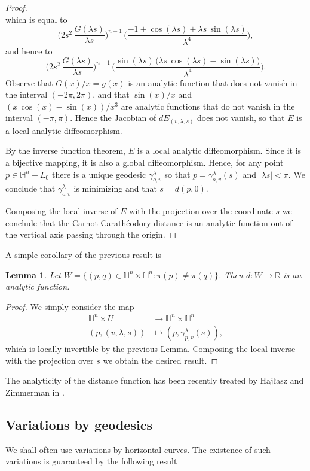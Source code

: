 \documentclass[10pt]{amsart}
\newtheorem{lemma}[theorem]{Lemma}
\theoremstyle{definition}
\theoremstyle{remark}
\numberwithin{equation}{section}
\begin{document}
\begin{proof}
\[\]
which is equal to
\[
\bigg(2s^2\,\frac{G({\lambda} s)}{{\lambda} s}\bigg)^{n-1}\,
\bigg(\frac{-1+\cos({\lambda} s)+{\lambda} s\,\sin({\lambda} s)}{{\lambda}^4}\bigg),
\]
and hence to
\[
\bigg(2s^2\,\frac{G({\lambda} s)}{{\lambda} s}\bigg)^{n-1}\,
\bigg(\frac{\sin({\lambda} s)\,\big({\lambda} s\,\cos({\lambda} s)-\sin({\lambda} s)\big)}{{\lambda}^4}\bigg).
\]
Observe that $G(x)/x=g(x)$ is an analytic function that does not vanish in
the interval $(-2\pi,2\pi)$, and that $\sin(x)/x$ and
$(x\,\cos(x)-\sin(x))/x^3$ are analytic functions that do not vanish
in the interval $(-\pi,\pi)$.  Hence the Jacobian of
$dE_{(v,{\lambda},s)}$ does not vanish, so that $E$ is a local analytic
diffeomorphism.

By the inverse function theorem, $E$ is a local analytic diffeomorphism.  Since it is a bijective mapping, it is also a global diffeomorphism.  Hence, for any point $p\in{{\mathbb{H}}}^n-L_{0}$ there is a unique geodesic ${\gamma}_{o,v}^{\lambda}$ so that $p={\gamma}_{o,v}^{\lambda}(s)$ and $|{\lambda} s|<\pi$.  We conclude that ${\gamma}_{o,v}^{\lambda}$ is minimizing and that $s=d(p,0)$.

Composing the local inverse of $E$ with the projection over the coordinate $s$ we conclude that the Carnot-Carath\'eodory distance is an analytic function out of the vertical axis passing through the
origin.
\end{proof}

A simple corollary of the previous result is

\begin{lemma}
Let $W=\{(p,q)\in{{\mathbb{H}}}^n\times{{\mathbb{H}}}^n : \pi(p)\neq\pi(q)\}$. Then
$d:W\to{{\mathbb{R}}}$ is an analytic function.
\end{lemma}

\begin{proof}
We simply consider the map
\begin{align*}
{{\mathbb{H}}}^n\times U&\to{{\mathbb{H}}}^n\times{{\mathbb{H}}}^n
\\
(p,(v,{\lambda},s))&\mapsto (p,{\gamma}_{p,v}^{\lambda}(s)),
\end{align*}
which is locally invertible by the previous Lemma. Composing the local
inverse with the projection over $s$ we obtain the desired result.
\end{proof}

The analyticity of the distance function has been recently treated by Haj\l asz and Zimmerman in \cite{MR3417082}.

\subsection{Variations by geodesics}
We shall often use variations by horizontal curves. The existence of such variations is guaranteed by the following result
\end{document}
